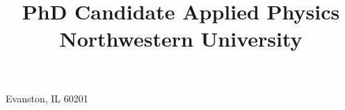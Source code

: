 \usepackage{textcomp}

\usepackage[margin=0.75in]{geometry}


\makeatletter %
\makeatother  %



\setlength{\hintscolumnwidth}{2.2cm}


\title{
	PhD Candidate\texorpdfstring{\newline}{}
    Applied Physics \texorpdfstring{\newline}{}
    Northwestern University
}

\address{1100 Church St, Apt 303}{Evanston, IL 60201}


\usepackage{multibib} %



